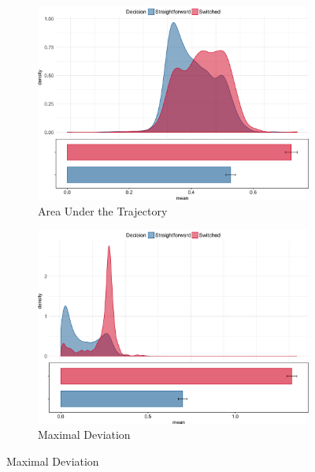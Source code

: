 \documentclass{article}
\begin{document}
\begin{figure}
\centering
\begin{subfigure}[b]{0.4\textwidth}
\includegraphics[width=\textwidth]{AUC_calibration.png}
\caption{Area Under the Trajectory}
\end{subfigure}
%
\begin{subfigure}[b]{0.4\textwidth}
\includegraphics[width=\textwidth]{MD_calibration.png}
\caption{Maximal Deviation}
\end{subfigure}


\end{figure}
\end{document}
